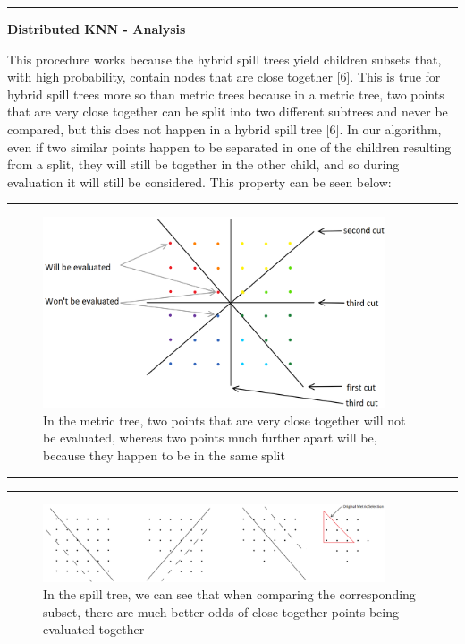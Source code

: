 \noindent\rule{12.1cm}{0.4pt}

\vspace{5 mm}
\noindent
\textbf{Distributed KNN - Analysis}

\vspace{5 mm}
\noindent
This procedure works because the hybrid spill trees yield children subsets that,
with high probability, contain nodes that are close together [6].  This is true for 
hybrid spill trees more so than metric trees because in a metric tree, two points
that are very close together can be split into two different subtrees and never be
compared, but this does not happen in a hybrid spill tree [6].  In our algorithm, even
if two similar points happen to be separated in one of the children resulting from
a split, they will still be together in the other child, and so during evaluation 
it will still be considered.  This property can be seen below:

\vspace{5 mm}
\noindent\rule{12.1cm}{0.4pt}

\begin{figure}[ht!]
\centering
\includegraphics[width=0.9\textwidth]{metric}
\caption{In the metric tree, two points that are very close together will not 
be evaluated, whereas two points much further apart will be, because they 
happen to be in the same split}
\end{figure}

\noindent\rule{12.1cm}{0.4pt}

\vspace{5 mm}
\noindent\rule{12.1cm}{0.4pt}

\begin{figure}[ht!]
\centering
\includegraphics[width=0.9\textwidth]{spill}
\caption{In the spill tree, we can see that when comparing the corresponding
subset, there are much better odds of close together points being evaluated
together}
\end{figure}

